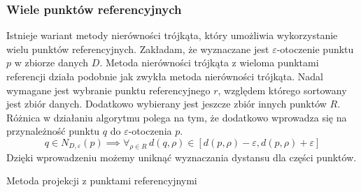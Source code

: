 \subsubsection{Wiele punktów referencyjnych}
Istnieje wariant metody nierówności trójkąta, który umożliwia wykorzystanie wielu punktów referencyjnych. Zakładam, że wyznaczane jest $ \varepsilon $-otoczenie punktu $ p $ w zbiorze danych $ D $. Metoda nierówności trójkąta z wieloma punktami referencji działa podobnie jak zwykła metoda nierówności trójkąta. Nadal wymagane jest wybranie punktu referencyjnego $ r $, względem którego sortowany jest zbiór danych. Dodatkowo wybierany jest jeszcze zbiór innych punktów $ R $. Różnica w działaniu algorytmu polega na tym, że dodatkowo wprowadza się  na przynależność punktu $ q $ do $ \varepsilon $-otoczenia $ p $.
\begin{equation}\label{eq:ti-reference-mult}
q \in N_{D,\varepsilon}(p) \implies  \forall_{\rho\in R}\,d(q,\rho) \in \left[d(p,\rho)-\varepsilon,d(p,\rho)+\varepsilon\right] 
\end{equation}
Dzięki wprowadzeniu  możemy uniknąć wyznaczania dystansu dla części punktów.

\begin{algorithm}[t]
	\caption{Metoda projekcji z punktami referencyjnymi}\label{alg:ti-mult}
	
	\DontPrintSemicolon
	
	
	\setcounter{AlgoLine}{0}
	\nonl{}
	\setcounter{AlgoLine}{0}
	\nonl{}
	
	\setcounter{AlgoLine}{0}
	\nonl{}
	\nonl{}
\end{algorithm} 